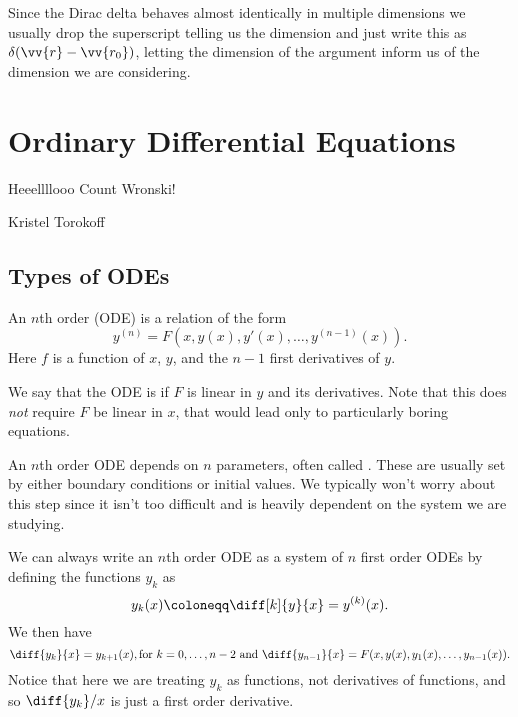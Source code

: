 \documentclass[fleqn]{NotesClass}
\begin{document}
    Since the Dirac delta behaves almost identically in multiple dimensions we usually drop the superscript telling us the dimension and just write this as \(\delta(\vv{r} - \vv{r_0})\), letting the dimension of the argument inform us of the dimension we are considering.
    
    \chapter{Ordinary Differential Equations}
    \epigraph{Heeellllooo Count Wronski!}{Kristel Torokoff}
    \section{Types of ODEs}
    An \(n\)th order  (ODE) is a relation of the form
    \begin{equation}
        y^{(n)} = F(x, y(x), y'(x), \dotsc, y^{(n-1)}(x)).
    \end{equation}
    Here \(f\) is a function of \(x\), \(y\), and the \(n - 1\) first derivatives of \(y\).
    
    We say that the ODE is  if \(F\) is linear in \(y\) and its derivatives.
    Note that this does \emph{not} require \(F\) be linear in \(x\), that would lead only to particularly boring equations.
    
    An \(n\)th order ODE depends on \(n\) parameters, often called .
    These are usually set by either boundary conditions or initial values.
    We typically won't worry about this step since it isn't too difficult and is heavily dependent on the system we are studying.
    
    We can always write an \(n\)th order ODE as a system of \(n\) first order ODEs by defining the functions \(y_k\) as
    \begin{equation}
        y_k(x) \coloneqq \diff[k]{y}{x} = y^{(k)}(x).
    \end{equation}
    We then have
    \begin{equation}
        \diff{y_k}{x} = y_{k+1}(x), \text{for \(k = 0, \dotsc, n - 2\) and } \diff{y_{n-1}}{x} = F(x, y(x), y_1(x), \dotsc, y_{n-1}(x)).\notag
    \end{equation}
    Notice that here we are treating \(y_k\) as functions, not derivatives of functions, and so \(\diff{y_k}/{x}\) is just a first order derivative.
    
\end{document}
